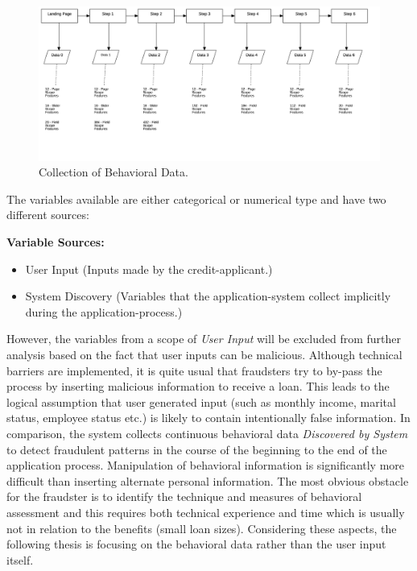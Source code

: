 \begin{figure}[h]
    \centering
    \includegraphics[scale=0.20]{Graphics/FlowchartDiagram1.png}
    \caption{Collection of Behavioral Data.}
    \label{fig:behav-data}
\end{figure}

The variables available are either categorical or numerical type and have two different sources:

\textbf{Variable Sources:}
\begin{itemize}
    \item User Input (Inputs made by the credit-applicant.)
    \item System Discovery (Variables that the application-system collect implicitly during the application-process.)
\end{itemize}

However, the variables from a scope of \textit{User Input} will be excluded from further analysis based on the fact that user inputs can be malicious. Although technical barriers are implemented, it is quite usual that fraudsters try to by-pass the process by inserting malicious information to receive a loan. This leads to the logical assumption that user generated input (such as monthly income, marital status, employee status etc.) is likely to contain intentionally false information. In comparison, the system collects continuous behavioral data \textit{Discovered by System} to detect fraudulent patterns in the course of the beginning to the end of the application process. Manipulation of behavioral information is significantly more difficult than inserting alternate personal information. The most obvious obstacle for the fraudster is to identify the technique and measures of behavioral assessment and this requires both technical experience and time which is usually not in relation to the benefits (small loan sizes). Considering these aspects, the following thesis is focusing on the behavioral data rather than the user input itself. 

